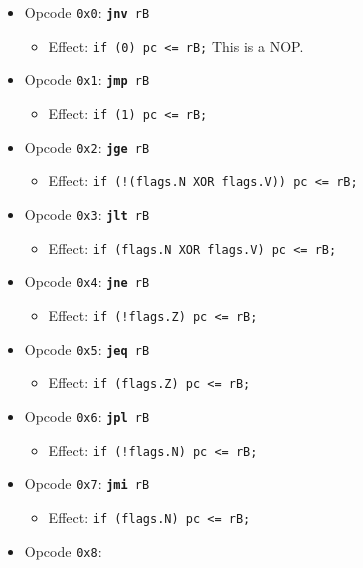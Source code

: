 \documentclass{article}
\begin{document}
	\singlespacing
	\begin{itemize}
		\item Opcode \texttt{0x0}:
			\texttt{\textbf{jnv} rB}
		\begin{itemize}
			\item Effect:
				\texttt{if (0) pc <= rB;} This is a NOP.
		\end{itemize}
		\item Opcode \texttt{0x1}:
			\texttt{\textbf{jmp} rB}
		\begin{itemize}
			\item Effect:
				\texttt{if (1) pc <= rB;}
		\end{itemize}
		\item Opcode \texttt{0x2}:
			\texttt{\textbf{jge} rB}
		\begin{itemize}
			\item Effect:
				\texttt{if (!(flags.N XOR flags.V)) pc <= rB;}
		\end{itemize}
		\item Opcode \texttt{0x3}:
			\texttt{\textbf{jlt} rB}
		\begin{itemize}
			\item Effect:
				\texttt{if (flags.N XOR flags.V) pc <= rB;}
		\end{itemize}
		\item Opcode \texttt{0x4}:
			\texttt{\textbf{jne} rB}
		\begin{itemize}
			\item Effect:
				\texttt{if (!flags.Z) pc <= rB;}
		\end{itemize}
		\item Opcode \texttt{0x5}:
			\texttt{\textbf{jeq} rB}
		\begin{itemize}
			\item Effect:
				\texttt{if (flags.Z) pc <= rB;}
		\end{itemize}
		\item Opcode \texttt{0x6}:
			\texttt{\textbf{jpl} rB}
		\begin{itemize}
			\item Effect:
				\texttt{if (!flags.N) pc <= rB;}
		\end{itemize}
		\item Opcode \texttt{0x7}:
			\texttt{\textbf{jmi} rB}
		\begin{itemize}
			\item Effect:
				\texttt{if (flags.N) pc <= rB;}
		\end{itemize}
		\item Opcode \texttt{0x8}:

\end{itemize}
\end{document}
